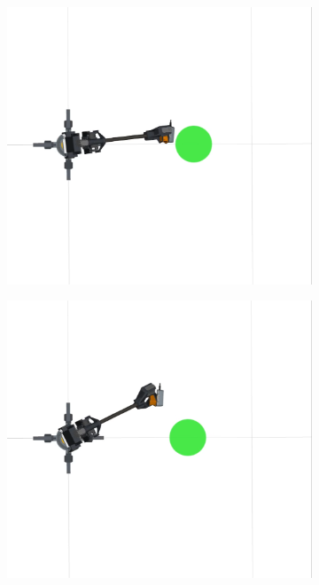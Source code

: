 \begin{figure}
\begin{subfigure}[b]{0.4\linewidth}
    \caption{}
  \end{subfigure}
  \begin{subfigure}[b]{0.4\linewidth}
    \includegraphics[width=\linewidth]{obs_avoidance_fail3.png}
    \caption{}
  \end{subfigure}
  \begin{subfigure}[b]{0.4\linewidth}
    \includegraphics[width=\linewidth]{obs_avoidance_fail4.png}

\end{subfigure}
\end{figure}
